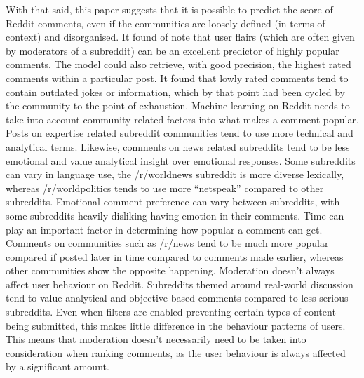 With that said, this paper \cite{9} suggests that it is possible to predict the score of Reddit comments, even if the communities are loosely defined (in terms of context) and disorganised. It found of note that user flairs (which are often given by moderators of a subreddit) can be an excellent predictor of highly popular comments. The model could also retrieve, with good precision, the highest rated comments within a particular post. It found that lowly rated comments tend to contain outdated jokes or information, which by that point had been cycled by the community to the point of exhaustion. Machine learning on Reddit needs to take into account community-related factors into what makes a comment popular. Posts on expertise related subreddit communities tend to use more technical and analytical terms. Likewise, comments on news related subreddits tend to be less emotional and value analytical insight over emotional responses. Some subreddits can vary in language use, the /r/worldnews subreddit is more diverse lexically, whereas /r/worldpolitics tends to use more “netspeak” compared to other subreddits. Emotional comment preference can vary between subreddits, with some subreddits heavily disliking having emotion in their comments. Time can play an important factor in determining how popular a comment can get. Comments on communities such as /r/news tend to be much more popular compared if posted later in time compared to comments made earlier, whereas other communities show the opposite happening. Moderation doesn’t always affect user behaviour on Reddit. Subreddits themed around real-world discussion tend to value analytical and objective based comments compared to less serious subreddits. Even when filters are enabled preventing certain types of content being submitted, this makes little difference in the behaviour patterns of users. This means that moderation doesn’t necessarily need to be taken into consideration when ranking comments, as the user behaviour is always affected by a significant amount.